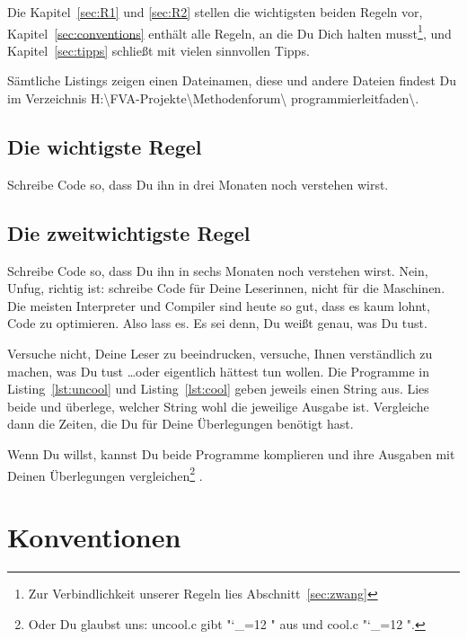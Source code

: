 \documentclass[twoside]{scrartcl}
\providecommand{\proot}{%
H:\textbackslash{}FVA-Projekte\textbackslash{}Methodenforum\textbackslash{}%
}
\providecommand{\pdir}{\proot{}programmierleitfaden\textbackslash{}}
\begin{document}
Die Kapitel~\ref{sec:R1} und \ref{sec:R2} stellen die wichtigsten beiden Regeln
vor, Kapitel~\ref{sec:conventions} enth\"a{}lt alle Regeln, an die Du Dich
halten musst\footnote{
  Zur Verbindlichkeit unserer Regeln lies Abschnitt~\ref{sec:zwang}
}, und Kapitel~\ref{sec:tipps} schlie\ss{}t mit vielen sinnvollen Tipps.

S\"a{}mtliche Listings zeigen einen Dateinamen, diese und andere  Dateien 
findest Du im Verzeichnis  
\pdir.


\subsection{Die wichtigste Regel\label{sec:R1}}
Schreibe Code so, dass Du ihn in drei Monaten noch verstehen wirst.

\subsection{Die zweitwichtigste Regel\label{sec:R2}}
Schreibe Code so, dass Du ihn in sechs Monaten noch verstehen wirst. Nein, 
Unfug, richtig ist: schreibe Code f\"u{}r Deine Leserinnen, nicht f\"u{}r die
Maschinen. Die meisten Interpreter und Compiler sind heute so gut, dass es
kaum lohnt, Code zu optimieren. Also lass es. Es sei denn, Du wei\ss{}t
genau, was Du tust. 

Versuche nicht, Deine Leser zu beeindrucken, versuche, Ihnen verst\"a{}ndlich zu
machen, was Du tust \ldots oder eigentlich h\"a{}ttest tun wollen.
Die Programme in  Listing~\ref{lst:uncool} und Listing~\ref{lst:cool} geben
jeweils einen String aus. Lies beide und
\"u{}berlege, welcher String wohl die jeweilige Ausgabe ist. Vergleiche dann die
Zeiten, die Du f\"u{}r Deine \"U{}berlegungen ben\"o{}tigt 
hast. 





Wenn Du willst, kannst Du  beide Programme komplieren und ihre Ausgaben mit
Deinen \"U{}berlegungen vergleichen\footnote{%
%
Oder Du glaubst uns: uncool.c gibt 
"\catcode`_=12 \ttfamily "
aus und cool.c 
"\catcode`_=12 \ttfamily ".
}%
. 

\section{Konventionen\label{sec:conventions}}
\end{document}
